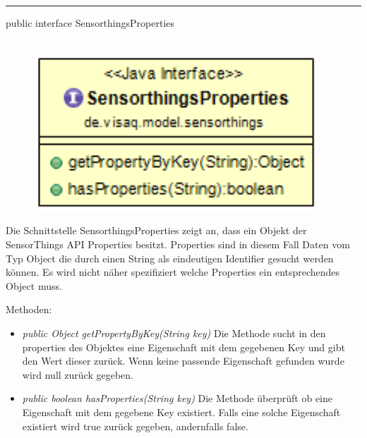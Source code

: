 \rule{\textwidth}{0.4pt}
public interface SensorthingsProperties
\\\\
\begin{minipage}{0.4\textwidth}
    \begin{figure}[H]
        {\centering\includegraphics[width=0.95\textwidth]{media/backend/modell/classes/SensorthingsProperties.png}}
    \end{figure}
    \end{minipage} \hfill
\begin{minipage}{0.6\textwidth}
Die Schnittstelle SensorthingsProperties zeigt an, dass ein Objekt der \gls{SensorThings API} Properties besitzt.
Properties sind in diesem Fall Daten vom Typ Object die durch einen String als eindeutigen Identifier gesucht werden können.
Es wird nicht näher spezifiziert welche Properties ein entsprechendes Object muss.
\end{minipage}

Methoden: \begin{itemize}
    \item \emph{public Object getPropertyByKey(String key)} Die Methode sucht in den properties des Objektes eine Eigenschaft mit dem gegebenen Key und gibt den Wert dieser zurück.
    Wenn keine passende Eigenschaft gefunden wurde wird null zurück gegeben.
    \item \emph{public boolean hasProperties(String key)} Die Methode überprüft ob eine Eigenschaft mit dem gegebene Key existiert.
    Falls eine solche Eigenschaft existiert wird true zurück gegeben, andernfalls false.
\end{itemize}

